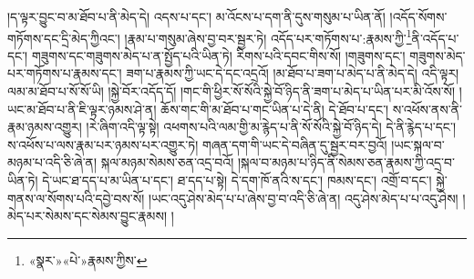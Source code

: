 །ད་ལྟར་བྱུང་བ་མ་ཐོབ་པ་ནི་མེད་དེ། འདས་པ་དང་། མ་འོངས་པ་དག་ནི་དུས་གསུམ་པ་ཡིན་ནོ། །འདོད་སོགས་གཏོགས་དང་དྲི་མེད་ཀྱིའང་། །རྣམ་པ་གསུམ་ཞེས་བྱ་བར་སྦྱར་ཏེ། འདོད་པར་གཏོགས་པ་:རྣམས་ཀྱི་\footnote{«སྣར་»«པེ་»རྣམས་ཀྱིས་}ནི་འདོད་པ་དང་། གཟུགས་དང་གཟུགས་མེད་པ་ན་སྤྱོད་པའི་ཡིན་ཏེ། རིགས་པའི་དབང་གིས་སོ། །གཟུགས་དང་། གཟུགས་མེད་པར་གཏོགས་པ་རྣམས་དང་། ཟག་པ་རྣམས་ཀྱི་ཡང་དེ་དང་འདྲའོ། །མ་ཐོབ་པ་ཟག་པ་མེད་པ་ནི་མེད་དེ། འདི་ལྟར། ལམ་མ་ཐོབ་པ་སོ་སོ་ཡི། །སྐྱེ་བོར་འདོད་དོ། །གང་གི་ཕྱིར་སོ་སོའི་སྐྱེ་བོ་ཉིད་ནི་ཟག་པ་མེད་པ་ཡིན་པར་མི་འོས་སོ། །ཡང་མ་ཐོབ་པ་ནི་ཇི་ལྟར་ཉམས་ཤེ་ན། ཆོས་གང་གི་མ་ཐོབ་པ་གང་ཡིན་པ་དེ་ནི། དེ་ཐོབ་པ་དང་། ས་འཕོས་ནས་ནི་རྣམ་ཉམས་འགྱུར། །རེ་ཞིག་འདི་ལྟ་སྟེ། འཕགས་པའི་ལམ་གྱི་མ་རྙེད་པ་ནི་སོ་སོའི་སྐྱེ་བོ་ཉིད་དེ། དེ་ནི་རྙེད་པ་དང་། ས་འཕོས་པ་ལས་རྣམ་པར་ཉམས་པར་འགྱུར་ཏེ། གཞན་དག་གི་ཡང་དེ་བཞིན་དུ་སྦྱར་བར་བྱའོ། །ཡང་སྐལ་བ་མཉམ་པ་འདི་ཅི་ཞེ་ན། སྐལ་མཉམ་སེམས་ཅན་འདྲ་བའོ། །སྐལ་བ་མཉམ་པ་ཉིད་ནི་སེམས་ཅན་རྣམས་ཀྱི་འདྲ་བ་ཡིན་ཏེ། དེ་ཡང་ཐ་དད་པ་མ་ཡིན་པ་དང་། ཐ་དད་པ་སྟེ། དེ་དག་ཁོ་ནའི་ས་དང་། ཁམས་དང་། འགྲོ་བ་དང་། སྐྱེ་གནས་ལ་སོགས་པའི་དབྱེ་བས་སོ། །ཡང་འདུ་ཤེས་མེད་པ་པ་ཞེས་བྱ་བ་འདི་ཅི་ཞེ་ན། འདུ་ཤེས་མེད་པ་པ་འདུ་ཤེས། །མེད་པར་སེམས་དང་སེམས་བྱུང་རྣམས། །
